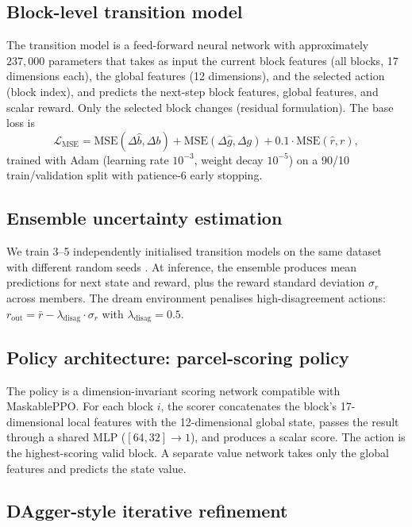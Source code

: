 \documentclass[11pt]{article}
\begin{document}
\subsection{Block-level transition model}

The transition model is a feed-forward neural network with approximately $237{,}000$ parameters that takes as input the current block features (all blocks, 17 dimensions each), the global features (12 dimensions), and the selected action (block index), and predicts the next-step block features, global features, and scalar reward. Only the selected block changes (residual formulation). The base loss is
\begin{equation}
\mathcal{L}_{\text{MSE}} = \mathrm{MSE}(\Delta\hat{b}, \Delta b) + \mathrm{MSE}(\Delta\hat{g}, \Delta g) + 0.1 \cdot \mathrm{MSE}(\hat{r}, r),
\end{equation}
trained with Adam (learning rate $10^{-3}$, weight decay $10^{-5}$) on a 90/10 train/validation split with patience-6 early stopping.

\subsection{Ensemble uncertainty estimation}

We train 3--5 independently initialised transition models on the same dataset with different random seeds \citep{lakshminarayanan2017simple}. At inference, the ensemble produces mean predictions for next state and reward, plus the reward standard deviation $\sigma_r$ across members. The dream environment penalises high-disagreement actions: $r_{\text{out}} = \bar{r} - \lambda_{\text{disag}} \cdot \sigma_r$ with $\lambda_{\text{disag}} = 0.5$.

\subsection{Policy architecture: parcel-scoring policy}

The policy is a dimension-invariant scoring network compatible with MaskablePPO. For each block $i$, the scorer concatenates the block's 17-dimensional local features with the 12-dimensional global state, passes the result through a shared MLP ($[64, 32] \to 1$), and produces a scalar score. The action is the highest-scoring valid block. A separate value network takes only the global features and predicts the state value.

\subsection{DAgger-style iterative refinement}
\end{document}
